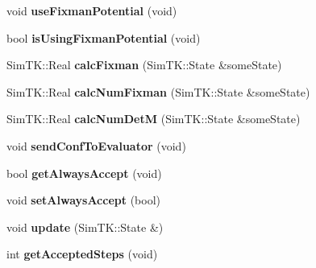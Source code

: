 \begin{DoxyCompactItemize}
\item 
void {\bfseries use\+Fixman\+Potential} (void)\hypertarget{classConformationalSearch_ad1602c7b9f5798a10014891e16f92e55}{}\label{classConformationalSearch_ad1602c7b9f5798a10014891e16f92e55}

\item 
bool {\bfseries is\+Using\+Fixman\+Potential} (void)\hypertarget{classConformationalSearch_a5196d77103c8ebddf76cf20d80776678}{}\label{classConformationalSearch_a5196d77103c8ebddf76cf20d80776678}

\item 
Sim\+T\+K\+::\+Real {\bfseries calc\+Fixman} (Sim\+T\+K\+::\+State \&some\+State)\hypertarget{classConformationalSearch_ad5bd251a7c87f4fe14902623cfb563cb}{}\label{classConformationalSearch_ad5bd251a7c87f4fe14902623cfb563cb}

\item 
Sim\+T\+K\+::\+Real {\bfseries calc\+Num\+Fixman} (Sim\+T\+K\+::\+State \&some\+State)\hypertarget{classConformationalSearch_ad37a01bf90ff5ddf057304d85db10f84}{}\label{classConformationalSearch_ad37a01bf90ff5ddf057304d85db10f84}

\item 
Sim\+T\+K\+::\+Real {\bfseries calc\+Num\+DetM} (Sim\+T\+K\+::\+State \&some\+State)\hypertarget{classConformationalSearch_ae588524a66f8c60ec2f9a3d64c25d478}{}\label{classConformationalSearch_ae588524a66f8c60ec2f9a3d64c25d478}

\item 
void {\bfseries send\+Conf\+To\+Evaluator} (void)\hypertarget{classConformationalSearch_a2f99ba20e4ddaba8cc93d3d767635f27}{}\label{classConformationalSearch_a2f99ba20e4ddaba8cc93d3d767635f27}

\item 
bool {\bfseries get\+Always\+Accept} (void)\hypertarget{classConformationalSearch_a05b4f8ae8a164278377351aeedac5150}{}\label{classConformationalSearch_a05b4f8ae8a164278377351aeedac5150}

\item 
void {\bfseries set\+Always\+Accept} (bool)\hypertarget{classConformationalSearch_a7ac67acfed3ab31bda075427ec86ae09}{}\label{classConformationalSearch_a7ac67acfed3ab31bda075427ec86ae09}

\item 
void {\bfseries update} (Sim\+T\+K\+::\+State \&)\hypertarget{classConformationalSearch_a0c5d9660ec343bd9e6910f6498375cc3}{}\label{classConformationalSearch_a0c5d9660ec343bd9e6910f6498375cc3}

\item 
int {\bfseries get\+Accepted\+Steps} (void)\hypertarget{classConformationalSearch_ac15a62651e9928188b2f617b742284e4}{}\label{classConformationalSearch_ac15a62651e9928188b2f617b742284e4}

\end{DoxyCompactItemize}

